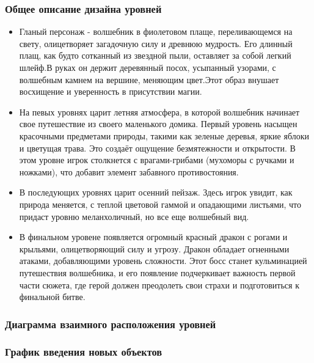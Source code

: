 \documentclass{article}
\begin{document}
\subsubsection{Общее описание дизайна уровней}
\begin{itemize}
    \item Гланый персонаж - волшебник в фиолетовом плаще, переливающемся на свету, олицетворяет загадочную силу и древнюю мудрость. Его длинный плащ, как будто сотканный из звездной пыли, оставляет за собой легкий шлейф.В руках он держит деревянный посох, усыпанный узорами, с волшебным камнем на вершине, меняющим цвет.Этот образ внушает восхищение и уверенность в присутствии магии.
    \item На певых уровнях царит летняя атмосфера, в которой волшебник начинает свое путешествие из своего маленького домика. Первый уровень насыщен красочными предметами природы, такими как зеленые деревья, яркие яблоки и цветущая трава. Это создаёт ощущение безмятежности и открытости. В этом уровне игрок столкнется с врагами-грибами (мухоморы с ручками и ножками), что добавит элемент забавного противостояния. 
    \item В последующих уровнях царит осенний пейзаж. Здесь игрок увидит, как природа меняется, с теплой цветовой гаммой и опадающими листьями, что придаст уровню меланхоличный, но все еще волшебный вид. 
    \item В финальном уровене появляется огромный красный дракон с рогами и крыльями, олицетворяющий силу и угрозу. Дракон обладает огненными атаками, добавляющими уровень сложности. Этот босс станет кульминацией путешествия волшебника, и его появление подчеркивает важность первой части сюжета, где герой должен преодолеть свои страхи и подготовиться к финальной битве.
\end{itemize}

\subsubsection{Диаграмма взаимного расположения уровней}
\subsubsection{ График введения новых объектов}
\end{document}
